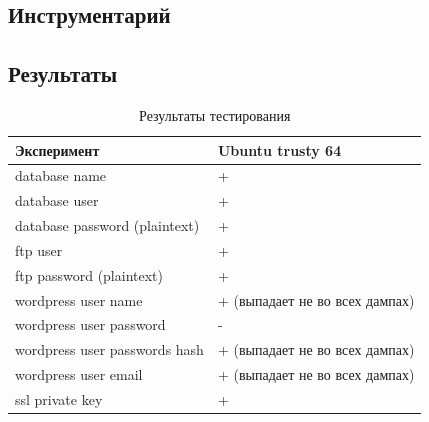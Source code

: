 \documentclass[20pt]{article}
\begin{document}
\subsection{Инструментарий}


\subsection{Результаты}

\begin{table}[]
\centering
\caption{Результаты тестирования}
\label{my-label}
\begin{tabular}{|l|l|}
\hline
Эксперимент                                                                                     & Ubuntu trusty 64               \\  \hline
database name                                                                                   & +                              \\  \hline
database user                                                                                   & +                              \\  \hline
database password (plaintext)                                                                   & +                              \\  \hline
ftp user                                                                                        & +                              \\  \hline
ftp password (plaintext)                                                                        & +                              \\  \hline
wordpress user name                                                                             & + (выпадает не во всех дампах) \\  \hline
wordpress user password                                                                         & -                              \\  \hline
wordpress user passwords hash                                                                   & + (выпадает не во всех дампах) \\  \hline
wordpress user email                                                                            & + (выпадает не во всех дампах) \\  \hline
ssl private key                                                                                 & +                              \\  \hline

\end{tabular}
\end{table}
\end{document}
